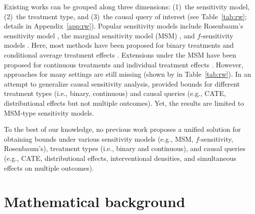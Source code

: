 \documentclass{article} %
\newcommand{\redcross}{\textcolor{BrickRed}{\ding{55}}}
\theoremstyle{definition}
\theoremstyle{plain}
\begin{document}
Existing works can be grouped along three dimensions: (1)~the sensitivity model, (2)~the treatment type, and (3)~the causal query of interest (see Table~\ref{tab:rw}; details in Appendix~\ref{app:rw}). Popular sensitivity models include Rosenbaum's sensitivity model \citep{Rosenbaum.1987}, the marginal sensitivity model (MSM) \citep{Tan.2006}, and $f$-sensitivity models \citep{Jin.2022}. Here, most methods have been proposed for binary treatments and conditional average treatment effects \citep{Kallus.2019, Zhao.2019, Jesson.2021, Dorn.2022, Dorn.2022b, Oprescu.2023}. Extensions under the MSM have been proposed for continuous treatments \citep{Jesson.2022, Marmarelis.2023} and individual treatment effects \citep{Yin.2022, Jin.2023, Marmarelis.2023b}. However, approaches for many settings are still missing (shown by \redcross\xspace in Table~\ref{tab:rw}). In an attempt to generalize causal sensitivity analysis, \citet{Frauen.2023c} provided bounds for different treatment types (i.e., binary, continuous) and causal queries (e.g., CATE, distributional effects but not multiple outcomes). Yet, the results are limited to MSM-type sensitivity models. %


To the best of our knowledge, no previous work proposes a unified solution for obtaining bounds under various sensitivity models (e.g., MSM, $f$-sensitivity, Rosenbaum's), treatment types (i.e., binary and continuous), and causal queries (e.g., CATE, distributional effects, interventional densities, and simultaneous effects on multiple outcomes). %



\section{Mathematical background}

\end{document}
